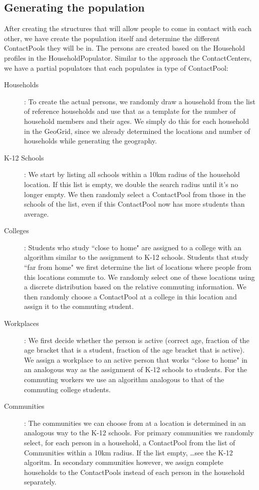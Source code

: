 \subsection{Generating the population}
\label{subsection:genpop}
After creating the structures that will allow people to come in contact with each other, we have create the population itself and determine the different ContactPools they will be in. The persons are created based on the Household profiles in the HouseholdPopulator. Similar to the approach the ContactCenters, we have a partial populators that 
each populates ia type of ContactPool:

\begin{description}
    \item[Households]:
        To create the actual persons, we randomly draw a household from the list of reference households 
        and use that as a template for the number of household members and their ages.
        We simply do this for each household in the GeoGrid, since we already determined 
        the locations and number of households while generating the geography.
    \item[K-12 Schools]:
        We start by listing all schools within a 10km radius of the household location. 
        If this list is empty, we double the search radius until it's no longer empty.
        We then randomly select a ContactPool from those in the schools of the list,
       even if this ContactPool now has more students than average.
    \item[Colleges]:
        Students who study ``close to home" are assigned to a college with an algorithm
        similar to the assignment to K-12 schools.
        Students that study ``far from home" we first determine the list of locations 
        where people from this locations commute to. We randomly select one of these locations 
        using a discrete distribution based on the relative commuting information.
        We then randomly choose a ContactPool at a college in this location and assign it to 
        the commuting student.
    \item[Workplaces]:
        We first decide whether the person is active (correct age, fraction of the age bracket that is a student,
        fraction of the age bracket that is active).
        We assign a workplace to an active person that works ``close to home" in an 
        analogous way as the assignment of K-12 schools to students.
        For the commuting workers we use an algorithm analogous to that of the commuting college students.
    \item[Communities]:
        The communities we can choose from at a location is determined in an analogous 
        way to the K-12 schools.
        For primary communities we randomly select, for each person in a household, a ContactPool 
        from the list of Communities within a 10km radius. If the list empty, \ldots see the K-12 algoritm.
        In secondary communities however, we assign complete households to the 
        ContactPools instead of each person in the household separately.
\end{description}

